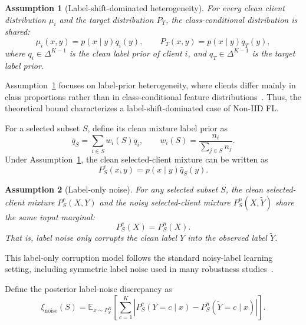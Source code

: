 ﻿\documentclass[conference]{IEEEtran}
\newtheorem{assumption}{Assumption}
\theoremstyle{definition}
\theoremstyle{remark}
\begin{document}
\begin{assumption}[Label-shift-dominated heterogeneity]
\label{assump:label_shift}
For every clean client distribution $\mu_i$ and the target distribution $P_T$, the class-conditional distribution is shared:
\begin{equation}
\mu_i(x,y)=p(x\mid y)q_i(y),
\qquad
P_T(x,y)=p(x\mid y)q_T(y),
\end{equation}
where $q_i\in\Delta^{K-1}$ is the clean label prior of client $i$, and $q_T\in\Delta^{K-1}$ is the target label prior.
\end{assumption}

Assumption~\ref{assump:label_shift} focuses on label-prior heterogeneity, where clients differ mainly in class proportions rather than in class-conditional feature distributions~\cite{lipton2018labelshift,hsu2019measuring}.
Thus, the theoretical bound characterizes a label-shift-dominated case of Non-IID FL.

For a selected subset $S$, define its clean mixture label prior as
\begin{equation}
\bar q_S
=
\sum_{i\in S}w_i(S)q_i,
\qquad
w_i(S)=\frac{n_i}{\sum_{j\in S}n_j}.
\end{equation}
Under Assumption~\ref{assump:label_shift}, the clean selected-client mixture can be written as
\begin{equation}
P_S^c(x,y)=p(x\mid y)\bar q_S(y).
\end{equation}

\begin{assumption}[Label-only noise]
\label{assump:label_only_noise}
For any selected subset $S$, the clean selected-client mixture $P_S^c(X,Y)$ and the noisy selected-client mixture $P_S^n(X,\widetilde Y)$ share the same input marginal:
\begin{equation}
P_S^c(X)=P_S^n(X).
\end{equation}
That is, label noise only corrupts the clean label $Y$ into the observed label $\widetilde Y$.
\end{assumption}
This label-only corruption model follows the standard noisy-label learning setting, including symmetric label noise used in many robustness studies~\cite{natarajan2013learning,patrini2017loss,liang2023fednoisy}.

Define the posterior label-noise discrepancy as
\begin{equation}
\label{eq:posterior_noise_discrepancy}
\xi_{\mathrm{noise}}(S)
=
\mathbb{E}_{x\sim P_S^X}
\left[
\sum_{c=1}^{K}
\left|
P_S^c(Y=c\mid x)
-
P_S^n(\widetilde Y=c\mid x)
\right|
\right].
\end{equation}
\end{document}
